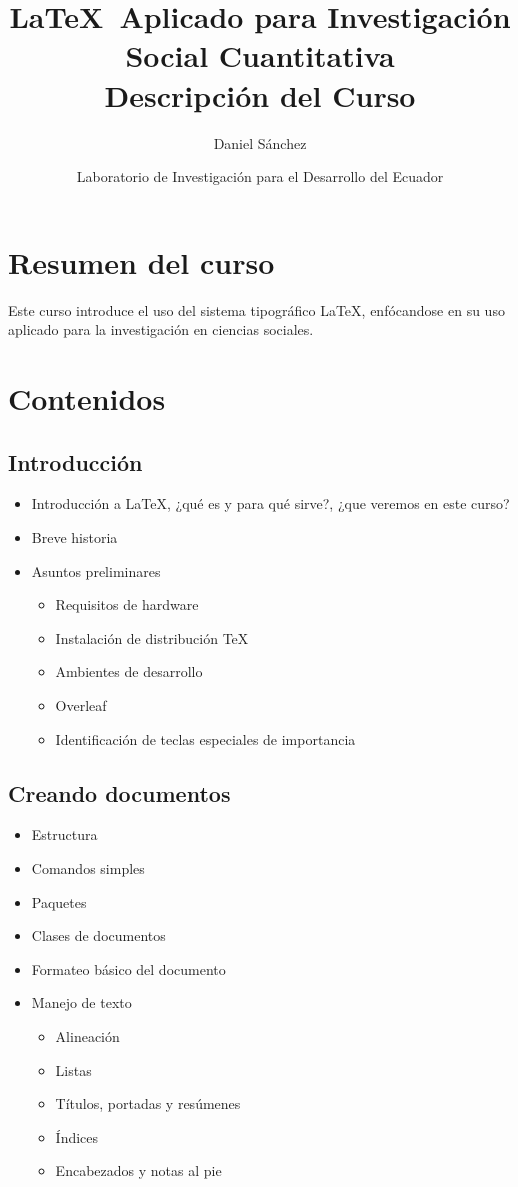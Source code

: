 \documentclass[a4paper,12pt]{article}
\title{\textbf{\LaTeX \ Aplicado para Investigación Social Cuantitativa} \\[1em] \Large Descripción del Curso}
\author{Daniel Sánchez}
\date{Laboratorio de Investigación para el Desarrollo del Ecuador}
\begin{document}
\maketitle

\section{Resumen del curso}

Este curso introduce el uso del sistema tipográfico \LaTeX, enfócandose en su uso aplicado para la investigación en ciencias sociales. 

\section{Contenidos}

\subsection{Introducción}

\begin{itemize}
    \item Introducción a \LaTeX, ¿qué es y para qué sirve?, ¿que veremos en este curso? 
    \item Breve historia
    \item Asuntos preliminares
    \begin{itemize}
        \item Requisitos de hardware
        \item Instalación de distribución \TeX
        \item Ambientes de desarrollo
        \item Overleaf
        \item Identificación de teclas especiales de importancia
    \end{itemize}
   
\end{itemize}

\subsection{Creando documentos}

\begin{itemize}
    \item Estructura
    \item Comandos simples
    \item Paquetes 
    \item Clases de documentos
    \item Formateo básico del documento 
    \item Manejo de texto
    \begin{itemize}
        \item Alineación
        \item Listas 
        \item Títulos, portadas y resúmenes
        \item Índices
        \item Encabezados y notas al pie
    \end{itemize}
\end{itemize}
\end{document}
